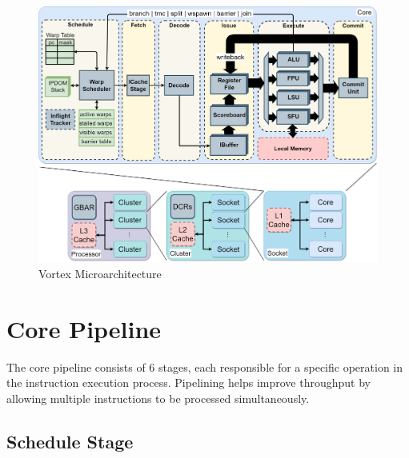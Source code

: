 \documentclass[12pt]{report}
\begin{document}
\begin{figure}[H]
    \centering
    \includegraphics[width=1\textwidth]{./figures/vortex_microarchitecture.png}
    \caption{Vortex Microarchitecture}
\end{figure}

\section{Core Pipeline}

The core pipeline consists of 6 stages, each responsible for a specific operation in the instruction execution process. Pipelining helps improve throughput by allowing multiple instructions to be processed simultaneously.

\subsection{Schedule Stage}
\end{document}
